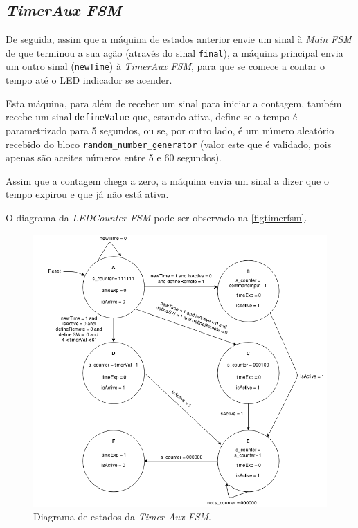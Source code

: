 \documentclass[a4paper,11pt,onecolumn]{report}
\begin{document}
\subsection{\textit{TimerAux FSM}}

De seguida, assim que a máquina de estados anterior envie um sinal à \textit{Main FSM} de que terminou a sua ação (através do sinal \texttt{final}), a máquina principal envia um outro sinal (\texttt{newTime}) à \textit{TimerAux FSM}, para que se comece a contar o tempo até o LED indicador se acender.

Esta máquina, para além de receber um sinal para iniciar a contagem, também recebe um sinal \texttt{defineValue} que, estando ativa, define se o tempo é parametrizado para 5 segundos, ou se, por outro lado, é um número aleatório recebido do bloco \texttt{random\_number\_generator} (valor este que é validado, pois apenas são aceites números entre 5 e 60 segundos).

Assim que a contagem chega a zero, a máquina envia um sinal a dizer que o tempo expirou e que já não está ativa.

O diagrama da \textit{LEDCounter FSM} pode ser observado na \autoref{figtimerfsm}.

\begin{figure}[h]
\centerline{\includegraphics[scale=0.33]{Images/TimerAuxFSMDiagram}}
\caption{Diagrama de estados da \textit{Timer Aux FSM}.}
\label{figtimerfsm}
\end{figure}
\end{document}
